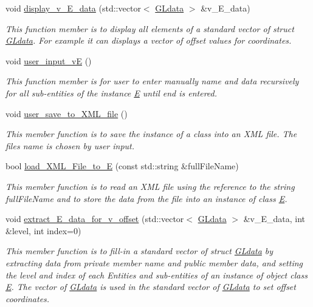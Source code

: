 \begin{DoxyCompactItemize}
void \hyperlink{group__group__display_ga81dcfc21d24912a6ffb5d45bcc852a68}{display\+\_\+v\+\_\+\+E\+\_\+data} (std\+::vector$<$ \hyperlink{structGLdata}{G\+Ldata} $>$ \&v\+\_\+\+E\+\_\+data)
\begin{DoxyCompactList}\small\item\em This function member is to display all elements of a standard vector of struct \hyperlink{structGLdata}{G\+Ldata}. For example it can displays a vector of offset values for coordinates. \end{DoxyCompactList}\item 
void \hyperlink{classE_a8be7dc3f091bf48c7c271f9e444d0492}{user\+\_\+input\+\_\+vE} ()
\begin{DoxyCompactList}\small\item\em This function member is for user to enter manually \textquotesingle{}name\textquotesingle{} and \textquotesingle{}data\textquotesingle{} recursively for all sub-\/entities of the instance \hyperlink{classE}{E} until \textquotesingle{}end\textquotesingle{} is entered. \end{DoxyCompactList}\item 
void \hyperlink{group__group__io_ga921d111e994a0c73640fb68c609a169c}{user\+\_\+save\+\_\+to\+\_\+\+X\+M\+L\+\_\+file} ()
\begin{DoxyCompactList}\small\item\em This member function is to save the instance of a class into an X\+ML file. The file\textquotesingle{}s name is chosen by user input. \end{DoxyCompactList}\item 
bool \hyperlink{group__group__io_ga599ade876fea62a08f1c2005908529c4}{load\+\_\+\+X\+M\+L\+\_\+\+File\+\_\+to\+\_\+E} (const std\+::string \&full\+File\+Name)
\begin{DoxyCompactList}\small\item\em This member function is to read an X\+ML file using the reference to the string full\+File\+Name and to store the data from the file into an instance of class \hyperlink{classE}{E}. \end{DoxyCompactList}\item 
void \hyperlink{group__group__io_gabfd75b5cdacabaea45ed25a8c261853a}{extract\+\_\+\+E\+\_\+data\+\_\+for\+\_\+v\+\_\+offset} (std\+::vector$<$ \hyperlink{structGLdata}{G\+Ldata} $>$ \&v\+\_\+\+E\+\_\+data, int \&level, int index=0)
\begin{DoxyCompactList}\small\item\em This member function is to fill-\/in a standard vector of struct \hyperlink{structGLdata}{G\+Ldata} by extracting data from private member \textquotesingle{}name\textquotesingle{} and public member \textquotesingle{}data\textquotesingle{}, and setting the level and index of each Entities and sub-\/entities of an instance of object class \hyperlink{classE}{E}. The vector of \hyperlink{structGLdata}{G\+Ldata} is used in the standard vector of \hyperlink{structGLdata}{G\+Ldata} to set offset coordinates. \end{DoxyCompactList}\item 

\end{DoxyCompactItemize}
